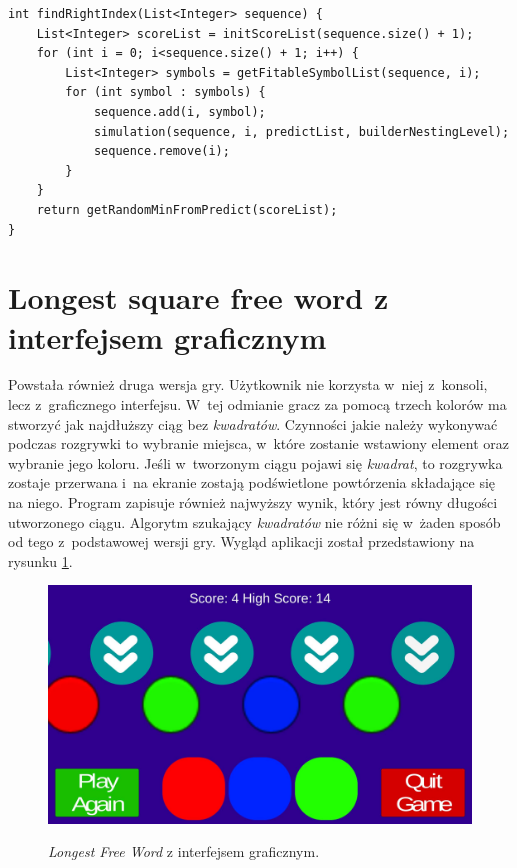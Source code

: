 \documentclass[document]{xmgr}
\begin{document}
\begin{lstlisting}[caption={Metoda szukająca pozycji, wykorzystująca rekurencję.},label=lst:findRightIndex]
int findRightIndex(List<Integer> sequence) {
	List<Integer> scoreList = initScoreList(sequence.size() + 1);
	for (int i = 0; i<sequence.size() + 1; i++) {
		List<Integer> symbols = getFitableSymbolList(sequence, i);
		for (int symbol : symbols) {
			sequence.add(i, symbol);
			simulation(sequence, i, predictList, builderNestingLevel);
			sequence.remove(i);
		}
	}
	return getRandomMinFromPredict(scoreList);
}
\end{lstlisting}

\section{Longest square free word z interfejsem graficznym}
Powstała również druga wersja gry. Użytkownik nie korzysta w~niej z~konsoli, lecz z~graficznego interfejsu. W~tej odmianie gracz za pomocą trzech kolorów ma stworzyć jak najdłuższy ciąg bez \emph{kwadratów}. Czynności jakie należy wykonywać podczas rozgrywki to wybranie miejsca, w~które zostanie wstawiony element oraz wybranie jego koloru. Jeśli w~tworzonym ciągu pojawi się \emph{kwadrat}, to rozgrywka zostaje przerwana i~na ekranie zostają podświetlone powtórzenia składające się na niego. Program zapisuje również najwyższy wynik, który jest równy długości utworzonego ciągu. Algorytm szukający \emph{kwadratów} nie różni się w~żaden sposób od tego z~podstawowej wersji gry. Wygląd aplikacji został przedstawiony na rysunku \ref{fig:thueMobile}.

\begin{figure}[tbh]
    \centering
    \caption{\emph{Longest Free Word} z interfejsem graficznym.}
    \includegraphics[width = \textwidth]{images/thueMobile}
    \label{fig:thueMobile}
\end{figure}
\end{document}
